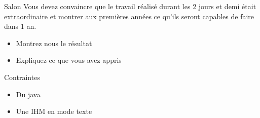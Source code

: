 \documentclass{beamer}
\begin{document}
\begin{frame}{Salon}
  Vous devez convaincre que le travail réalisé durant les 2 jours et demi était extraordinaire et montrer aux premières années ce qu'ils seront capables de faire dans 1 an.
  \begin{itemize}
    \item Montrez nous le résultat
    \item Expliquez ce que vous avez appris
  \end{itemize}
\end{frame}

\begin{frame}{Contraintes}
  \begin{itemize}
    \item Du java
    \item Une IHM en mode texte
  \end{itemize}
\end{frame}
\end{document}
